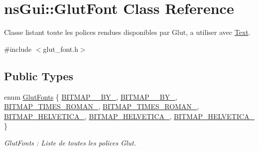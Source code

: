 \hypertarget{classns_gui_1_1_glut_font}{}\section{ns\+Gui\+:\+:Glut\+Font Class Reference}
\label{classns_gui_1_1_glut_font}


Classe listant toute les polices rendues disponibles par Glut, a utiliser avec \hyperlink{classns_gui_1_1_text}{Text}.  




{\ttfamily \#include $<$glut\+\_\+font.\+h$>$}

\subsection*{Public Types}
\begin{DoxyCompactItemize}
\item 
enum \hyperlink{classns_gui_1_1_glut_font_aeeeb02d69e7dfc7e57957bd658c465ce}{Glut\+Fonts} \{ \newline
\hyperlink{classns_gui_1_1_glut_font_aeeeb02d69e7dfc7e57957bd658c465cea9c75a2a144604631db2af2ae284a9d82}{B\+I\+T\+M\+A\+P\+\_\+\_\+\+B\+Y\+\_}, 
\hyperlink{classns_gui_1_1_glut_font_aeeeb02d69e7dfc7e57957bd658c465ceafc7dc7274d17bd604f3cf91412650df0}{B\+I\+T\+M\+A\+P\+\_\+\_\+\+B\+Y\+\_}, 
\hyperlink{classns_gui_1_1_glut_font_aeeeb02d69e7dfc7e57957bd658c465cea35de9b7dc33c5aa8672423552fe83b38}{B\+I\+T\+M\+A\+P\+\_\+\+T\+I\+M\+E\+S\+\_\+\+R\+O\+M\+A\+N\+\_}, 
\hyperlink{classns_gui_1_1_glut_font_aeeeb02d69e7dfc7e57957bd658c465cea466dd22d811df1310583c1a59d0103b0}{B\+I\+T\+M\+A\+P\+\_\+\+T\+I\+M\+E\+S\+\_\+\+R\+O\+M\+A\+N\+\_}, 
\newline
\hyperlink{classns_gui_1_1_glut_font_aeeeb02d69e7dfc7e57957bd658c465ceae127744cea36edcff85327da64221d14}{B\+I\+T\+M\+A\+P\+\_\+\+H\+E\+L\+V\+E\+T\+I\+C\+A\+\_}, 
\hyperlink{classns_gui_1_1_glut_font_aeeeb02d69e7dfc7e57957bd658c465ceab87b397237206af607190619163ec1e6}{B\+I\+T\+M\+A\+P\+\_\+\+H\+E\+L\+V\+E\+T\+I\+C\+A\+\_}, 
\hyperlink{classns_gui_1_1_glut_font_aeeeb02d69e7dfc7e57957bd658c465cea11c7a92d3233d33d71de4ca2f0e27437}{B\+I\+T\+M\+A\+P\+\_\+\+H\+E\+L\+V\+E\+T\+I\+C\+A\+\_}
 \}\begin{DoxyCompactList}\small\item\em Glut\+Fonts \+: Liste de toutes les polices Glut. \end{DoxyCompactList}
\end{DoxyCompactItemize}
